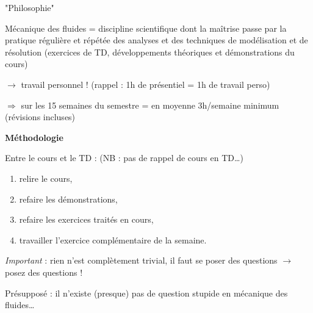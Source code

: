 \begin{frame}{"Philosophie"}

\small

Mécanique des fluides = discipline scientifique dont la maîtrise passe par la pratique régulière et
 répétée des analyses et des techniques de modélisation et de résolution 
 (exercices de TD, développements théoriques et démonstrations du cours)

\bigskip

\qquad $\rightarrow$ \textcolor{rouge}{travail personnel !} \quad (rappel : 1h de présentiel = 1h de travail perso)

\medskip
\qquad $\Rightarrow$ sur les 15 semaines du semestre = en moyenne 3h/semaine minimum (révisions incluses)

\vspace{5mm}
\pause

\textbf{Méthodologie}

\medskip
Entre le cours et le TD : \hfill (NB : pas de rappel de cours en TD\ldots)
\begin{enumerate}
\item relire le cours, 
\item refaire les démonstrations,
\item refaire les exercices traités en cours,
\item travailler l'exercice complémentaire de la semaine.
\end{enumerate}

\vspace{5mm}
\pause

\textsl{Important} : rien n'est complètement trivial, il faut \textcolor{rouge}{se} poser des questions 
$\rightarrow$ \textcolor{rouge}{posez des questions !}

\medskip
Présupposé : il n'existe (presque) pas de question stupide en mécanique des fluides\ldots

\vspace{10mm}

\end{frame}

